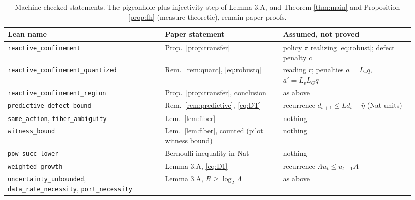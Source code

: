 \documentclass[11pt]{article}
\theoremstyle{definition}
\theoremstyle{remark}
\newcommand{\etabar}{\bar{\eta}}
\begin{document}
\begin{table}[ht]
\centering
\footnotesize
\begin{tabular}{p{0.36\linewidth}p{0.27\linewidth}p{0.3\linewidth}}
\toprule
Lean name & Paper statement & Assumed, not proved \\
\midrule
\texttt{reactive\_confinement} & Prop.\ \ref{prop:transfer} & policy $\pi$ realizing \eqref{eq:robust}; defect penalty $c$ \\
\texttt{reactive\_confinement\_quantized} & Rem.\ \ref{rem:quant}, \eqref{eq:robustq} & reading $r$; penalties $a=L_vq$, $a'=L_vL_Gq$ \\
\texttt{reactive\_confinement\_region} & Prop.\ \ref{prop:transfer}, conclusion & as above \\
\texttt{predictive\_defect\_bound} & Rem.\ \ref{rem:predictive}, \eqref{eq:DT} & recurrence $d_{t+1}\le Ld_t+\etabar$ (Nat units) \\
\texttt{same\_action}, \texttt{fiber\_ambiguity} & Lem.\ \ref{lem:fiber} & nothing \\
\texttt{witness\_bound} & Lem.\ \ref{lem:fiber}, counted (pilot witness bound) & nothing \\
\texttt{pow\_succ\_lower} & Bernoulli inequality in Nat & nothing \\
\texttt{weighted\_growth} & Lemma 3.A, \eqref{eq:D1} & recurrence $\Lambda u_t\le u_{t+1}A$ \\
\texttt{uncertainty\_unbounded}, \texttt{data\_rate\_necessity}, \texttt{port\_necessity} & Lemma 3.A, $R\ge\log_2\Lambda$ & as above \\
\bottomrule
\end{tabular}
\caption{Machine-checked statements. The pigeonhole-plus-injectivity step of Lemma 3.A, and Theorem \ref{thm:main} and Proposition \ref{prop:fh} (measure-theoretic), remain paper proofs.}
\label{tab:lean}
\end{table}
\end{document}
